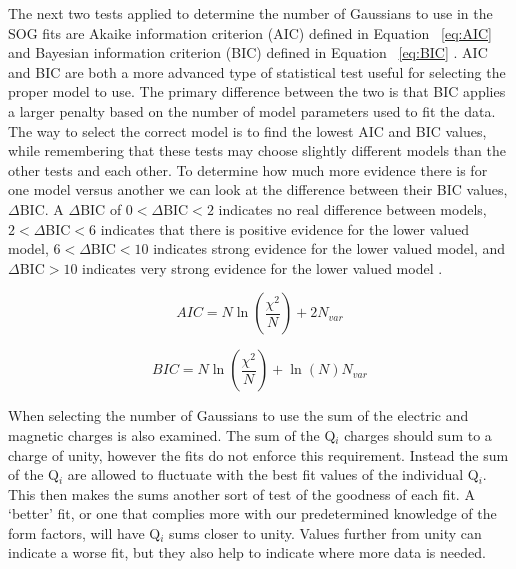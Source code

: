 The next two tests applied to determine the number of Gaussians to use in the SOG fits are Akaike information criterion (AIC) defined in Equation ~\ref{eq:AIC} \cite{Article:AIC} and Bayesian information criterion (BIC) defined in Equation ~\ref{eq:BIC} \cite{Article:BIC} \cite{doug_stats}. AIC and BIC are both a more advanced type of statistical test useful for selecting the proper model to use. The primary difference between the two is that BIC applies a larger penalty based on the number of model parameters used to fit the data. The way to select the correct model is to find the lowest AIC and BIC values, while remembering that these tests may choose slightly different models than the other tests and each other. To determine how much more evidence there is for one model versus another we can look at the difference between their BIC values, $\Delta$BIC. A $\Delta$BIC of $0<\Delta$BIC$<2$ indicates no real difference between models, $2<\Delta$BIC$<6$ indicates that there is positive evidence for the lower valued model, $6<\Delta$BIC$<10$ indicates strong evidence for the lower valued model, and $\Delta$BIC$>10$ indicates very strong evidence for the lower valued model \cite{Article:Delta_BIC}.

\begin{equation} \label{eq:AIC}
	AIC = N \ln\left( \frac{\chi^2}{N} \right) + 2 N_{var}
\end{equation}

\begin{equation} \label{eq:BIC}
	BIC = N \ln\left( \frac{\chi^2}{N} \right) +  \ln\left( N \right) N_{var}
\end{equation}

When selecting the number of Gaussians to use the sum of the electric and magnetic charges is also examined. The sum of the Q$_i$ charges should sum to a charge of unity, however the fits do not enforce this requirement. Instead the sum of the Q$_i$ are allowed to fluctuate with the best fit values of the individual Q$_i$. This then makes the sums another sort of test of the goodness of each fit. A `better' fit, or one that complies more with our predetermined knowledge of the form factors, will have Q$_i$ sums closer to unity. Values further from unity can indicate a worse fit, but they also help to indicate where more data is needed.


